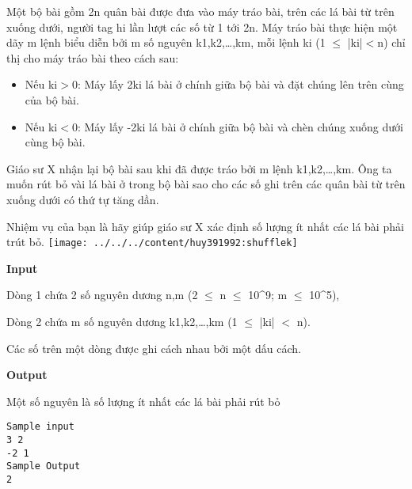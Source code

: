 

Một bộ bài gồm 2n quân bài được đưa vào máy tráo bài, trên các lá bài từ trên xuống dưới, người tag hi lần lượt các số từ 1 tới 2n. Máy tráo bài thực hiện một dãy m lệnh biểu diễn bởi m số nguyên k1,k2,…,km, mỗi lệnh ki (1 $\le$ |ki|$<$n) chỉ thị cho máy tráo bài theo cách sau:
\begin{itemize}
	\item Nếu ki$>$0: Máy lấy 2ki lá bài ở chính giữa bộ bài và đặt chúng lên trên cùng của bộ bài.
\end{itemize}
\begin{itemize}
	\item Nếu ki$<$0: Máy lấy -2ki lá bài ở chính giữa bộ bài và chèn chúng xuống dưới cùng bộ bài.
\end{itemize}

Giáo sư X nhận lại bộ bài sau khi đã được tráo bởi m lệnh k1,k2,…,km. Ông ta muốn rút bỏ vài lá bài ở trong bộ bài sao cho các số ghi trên các quân bài từ trên xuống dưới có thứ tự tăng dần.

Nhiệm vụ của bạn là hãy giúp giáo sư X xác định số lượng ít nhất các lá bài phải trút bỏ.
\texttt{[image: ../../../content/huy391992:shufflek]}

\textbf{Input}

Dòng 1 chứa 2 số nguyên dương n,m (2  $\le$  n  $\le$  10^9; m  $\le$  10^5),

Dòng 2 chứa m số nguyên dương k1,k2,…,km (1  $\le$  |ki| $<$ n).

Các số trên một dòng được ghi cách nhau bởi một dấu cách.

\textbf{Output}

Một số nguyên là số lượng ít nhất các lá bài phải rút bỏ
\begin{verbatim}
Sample input
3 2
-2 1
Sample Output
2\end{verbatim}

 
